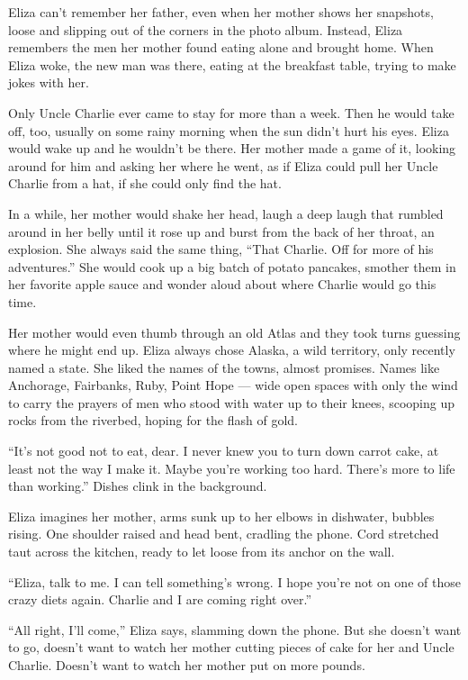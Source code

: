 \documentclass[
]{article}
\begin{document}
Eliza can't remember her father, even when her mother shows her
snapshots, loose and slip­ping out of the corners in the photo album.
Instead, Eliza remembers the men her mother found eat­ing alone and
brought home. When Eliza woke, the new man was there, eating at the
breakfast table, trying to make jokes with her.

Only Uncle Charlie ever came to stay for more than a week. Then he would
take off, too, usu­ally on some rainy morning when the sun didn't hurt
his eyes. Eliza would wake up and he wouldn't be there. Her mother made
a game of it, looking around for him and asking her where he went, as if
Eliza could pull her Uncle Charlie from a hat, if she could only find
the hat.

In a while, her mother would shake her head, laugh a deep laugh that
rumbled around in her belly until it rose up and burst from the back of
her throat, an explosion. She always said the same thing, ``That
Charlie. Off for more of his adventures.'' She would cook up a big batch
of potato pan­cakes, smother them in her favorite apple sauce and wonder
aloud about where Charlie would go this time.

Her mother would even thumb through an old Atlas and they took turns
guessing where he might end up. Eliza always chose Alaska, a wild
territory, only recently named a state. She liked the names of the
towns, almost promises. Names like Anchorage, Fairbanks, Ruby, Point
Hope --- wide open spaces with only the wind to carry the prayers of men
who stood with water up to their knees, scooping up rocks from the
riverbed, hoping for the flash of gold.

``It's not good not to eat, dear. I never knew you to turn down carrot
cake, at least not the way I make it. Maybe you're working too hard.
There's more to life than working.'' Dishes clink in the back­ground.

Eliza imagines her mother, arms sunk up to her elbows in dishwater,
bubbles rising. One shoulder raised and head bent, cradling the phone.
Cord stretched taut across the kitchen, ready to let loose from its
anchor on the wall.

``Eliza, talk to me. I can tell something's wrong. I hope you're not on
one of those crazy diets again. Charlie and I are coming right over.''

``All right, I'll come,'' Eliza says, slamming down the phone. But she
doesn't want to go, doesn't want to watch her mother cutting pieces of
cake for her and Uncle Charlie. Doesn't want to watch her mother put on
more pounds.
\end{document}
